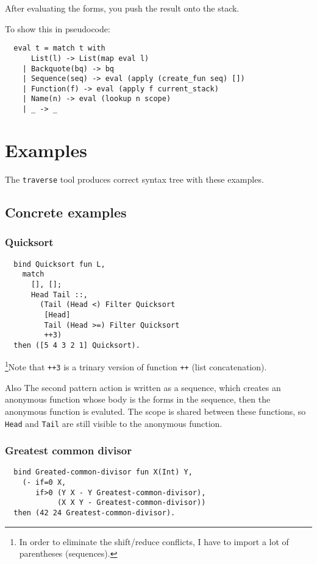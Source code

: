 \documentclass{book}
\begin{document}
After evaluating the forms, you push the result onto the stack.

To show this in pseudocode:
\begin{verbatim}
  eval t = match t with
      List(l) -> List(map eval l)
    | Backquote(bq) -> bq
    | Sequence(seq) -> eval (apply (create_fun seq) [])
    | Function(f) -> eval (apply f current_stack)
    | Name(n) -> eval (lookup n scope)
    | _ -> _
\end{verbatim}

\chapter{Examples}

The \texttt{traverse} tool produces correct syntax tree with these examples.

\section{Concrete examples}
\subsection{Quicksort}
\begin{verbatim}
  bind Quicksort fun L,
    match
      [], [];
      Head Tail ::,
        (Tail (Head <) Filter Quicksort
         [Head]
         Tail (Head >=) Filter Quicksort
         ++3)
  then ([5 4 3 2 1] Quicksort).
\end{verbatim}

\footnote{In order to eliminate the shift/reduce conflicts, I have to import a lot of parentheses (sequences).}Note that \texttt{++3} is a trinary version of function \texttt{++} (list concatenation).

Also The second pattern action is written as a sequence, which creates an anonymous function whose body is the forms in the sequence, then the anonymous function is evaluted. The scope is shared between these functions, so \texttt{Head} and \texttt{Tail} are still visible to the anonymous function.

\subsection{Greatest common divisor}
\begin{verbatim}
  bind Greated-common-divisor fun X(Int) Y,
    (- if=0 X,
       if>0 (Y X - Y Greatest-common-divisor),
            (X X Y - Greatest-common-divisor))
  then (42 24 Greatest-common-divisor).
\end{verbatim}
\end{document}
